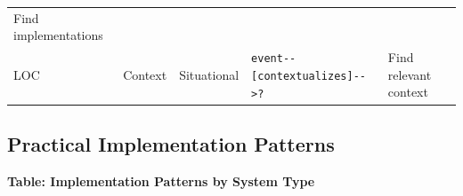 \documentclass[
  11pt,
  letterpaper,
]{article}
\begin{document}
\begin{longtable}[]{@{}lllll@{}}
\begin{minipage}[t]{0.25\columnwidth}
Find implementations\strut
\end{minipage}\tabularnewline
\begin{minipage}[t]{0.07\columnwidth}\raggedright
LOC\strut
\end{minipage} & \begin{minipage}[t]{0.16\columnwidth}\raggedright
Context\strut
\end{minipage} & \begin{minipage}[t]{0.21\columnwidth}\raggedright
Situational\strut
\end{minipage} & \begin{minipage}[t]{0.16\columnwidth}\raggedright
\texttt{event-\/-{[}contextualizes{]}-\/-\textgreater{}?}\strut
\end{minipage} & \begin{minipage}[t]{0.25\columnwidth}\raggedright
Find relevant context\strut
\end{minipage}\tabularnewline
\bottomrule
\end{longtable}

\hypertarget{practical-implementation-patterns}{%
\subsection{Practical Implementation
Patterns}\label{practical-implementation-patterns}}

\textbf{Table: Implementation Patterns by System Type}
\end{document}
